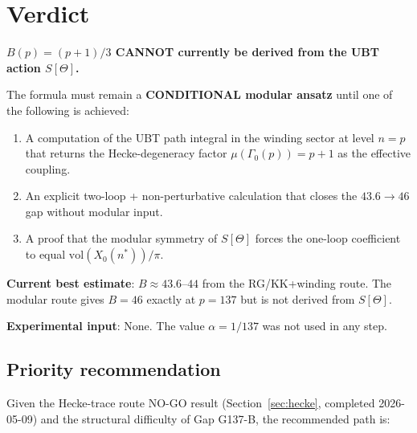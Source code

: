 \documentclass[12pt,a4paper]{article}
\theoremstyle{definition}
\theoremstyle{remark}
\begin{document}
\section{Verdict}
\label{sec:verdict}

\begin{tcolorbox}[colback=red!5!white, colframe=red!65!black, title=\textbf{Verdict on Gap G137-B}]
\textbf{$B(p) = (p+1)/3$ CANNOT currently be derived from the UBT action
$S[\Theta]$.}

\medskip

The formula must remain a \textbf{CONDITIONAL modular ansatz} until one of the
following is achieved:
\begin{enumerate}
  \item A computation of the UBT path integral in the winding sector at level
        $n = p$ that returns the Hecke-degeneracy factor $\mu(\Gamma_0(p)) = p+1$
        as the effective coupling.
  \item An explicit two-loop + non-perturbative calculation that closes the
        $43.6 \to 46$ gap without modular input.
  \item A proof that the modular symmetry of $S[\Theta]$ forces the one-loop
        coefficient to equal $\mathrm{vol}(X_0(n^*))/\pi$.
\end{enumerate}

\medskip
\noindent\textbf{Current best estimate}: $B \approx 43.6$--$44$ from the
RG/KK+winding route.  The modular route gives $B = 46$ exactly at $p = 137$
but is not derived from $S[\Theta]$.

\medskip
\noindent\textbf{Experimental input}: None.  The value $\alpha = 1/137$ was
not used in any step.
\end{tcolorbox}

\subsection{Priority recommendation}

Given the Hecke-trace route NO-GO result (Section~\ref{sec:hecke},
completed 2026-05-09) and the structural difficulty of Gap G137-B,
the recommended path is:
\end{document}
